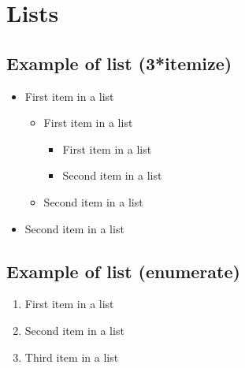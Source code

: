 \documentclass[paper=a4, fontsize=11pt]{scrartcl} %
\numberwithin{equation}{section} %
\numberwithin{figure}{section} %
\numberwithin{table}{section} %
\begin{document}
\lipsum[6] %


\section{Lists}


\subsection{Example of list (3*itemize)}
\begin{itemize}
	\item First item in a list
		\begin{itemize}
		\item First item in a list
			\begin{itemize}
			\item First item in a list
			\item Second item in a list
			\end{itemize}
		\item Second item in a list
		\end{itemize}
	\item Second item in a list
\end{itemize}


\subsection{Example of list (enumerate)}
\begin{enumerate}
\item First item in a list
\item Second item in a list
\item Third item in a list
\end{enumerate}

\end{document}

